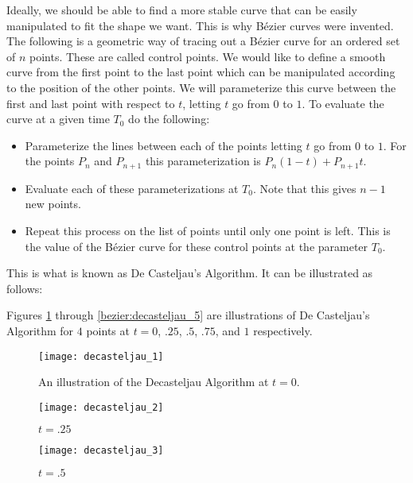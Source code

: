 Ideally, we should be able to find a more stable curve that can be easily manipulated to fit the shape we want.
This is why B\'{e}zier curves were invented.
The following is a geometric way of tracing out a B\'{e}zier curve for an ordered set of $n$ points.
These are called control points.
We would like to define a smooth curve from the first point to the last point which can be manipulated according to the position of the other points.
We will parameterize this curve between the first and last point with respect to $t$, letting $t$ go from $0$ to $1$.
To evaluate the curve at a given time $T_0$ do the following:
\begin{itemize}

\item

Parameterize the lines between each of the points letting $t$ go from $0$ to $1$.
For the points $P_{n}$ and $P_{n+1}$ this parameterization is $P_{n} (1-t) + P_{n+1} t$.

\item

Evaluate each of these parameterizations at $T_0$.
Note that this gives $n-1$ new points.

\item

Repeat this process on the list of points until only one point is left.
This is the value of the B\'{e}zier curve for these control points at the parameter $T_0$.

\end{itemize}

This is what is known as De Casteljau's Algorithm. 
It can be illustrated as follows:

Figures \ref{bezier:decasteljau_1} through \ref{bezier:decasteljau_5} are illustrations of De Casteljau's Algorithm for $4$ points at $t= 0$, $.25$, $.5$, $.75$, and $1$ respectively.

\begin{figure}
\texttt{[image: decasteljau\_1]}
\caption{An illustration of the Decasteljau Algorithm at $t=0$.}
\label{bezier:decasteljau_1}
\end{figure}

\begin{figure}
\texttt{[image: decasteljau\_2]}
\caption{$t=.25$}
\label{bezier:decasteljau_2}
\end{figure}

\begin{figure}
\texttt{[image: decasteljau\_3]}
\caption{$t=.5$}
\label{bezier:decasteljau_3}
\end{figure}


